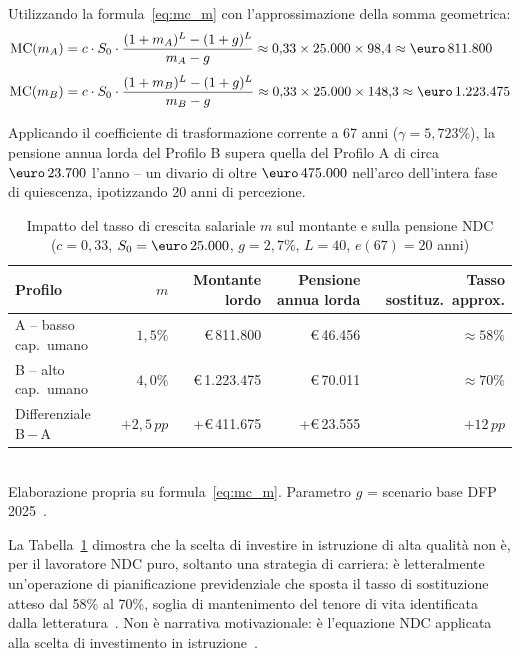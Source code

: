 Utilizzando la formula~\eqref{eq:mc_m} con l'approssimazione della
somma geometrica:
%
\begin{align}
  \mathrm{MC}(m_A) &= c \cdot S_0 \cdot
    \frac{(1+m_A)^L - (1+g)^L}{m_A - g}
    \approx 0{,}33 \times 25.000 \times 98{,}4
    \approx \text{\euro}\,811.800
    \label{eq:mc_A}\\[4pt]
  \mathrm{MC}(m_B) &= c \cdot S_0 \cdot
    \frac{(1+m_B)^L - (1+g)^L}{m_B - g}
    \approx 0{,}33 \times 25.000 \times 148{,}3
    \approx \text{\euro}\,1.223.475
    \label{eq:mc_B}
\end{align}

Applicando il coefficiente di trasformazione corrente a 67 anni
(\(\gamma = 5{,}723\%\)), la pensione annua lorda del Profilo B supera quella
del Profilo A di circa \(\text{\euro}\,23.700\) l'anno --
un divario di oltre \(\text{\euro}\,475.000\) nell'arco dell'intera fase di
quiescenza, ipotizzando 20 anni di percezione.

\begin{table}[htbp]
\centering
\caption{Impatto del tasso di crescita salariale \(m\) sul montante
         e sulla pensione NDC\\
         (\(c=0{,}33\), \(S_0=\text{\euro}\,25.000\), \(g=2{,}7\%\),
          \(L=40\), \(e(67)=20\) anni)}
\label{tab:montante_m}
\begin{tabular}{lrrrr}
\toprule
Profilo & \(m\) & Montante lordo &
  Pensione annua lorda & Tasso sostituz.\ approx.\\
\midrule
A -- basso cap.\ umano & \(1{,}5\%\) &
  \euro\,811.800 & \euro\,46.456 & $\approx 58\%$ \\
B -- alto cap.\ umano  & \(4{,}0\%\) &
  \euro\,1.223.475 & \euro\,70.011 & $\approx 70\%$ \\
\midrule
Differenziale B\,$-$\,A & $+2{,}5\,pp$ &
  +\euro\,411.675 & +\euro\,23.555 & $+12\,pp$ \\
\bottomrule
\end{tabular}
\smallskip\\
\footnotesize Elaborazione propria su formula~\eqref{eq:mc_m}.
Parametro \(g\) = scenario base DFP 2025~\cite{MEFRGS2025}.
\end{table}

La Tabella~\ref{tab:montante_m} dimostra che la scelta di investire in
istruzione di alta qualità non è, per il lavoratore NDC puro, soltanto una
strategia di carriera: è letteralmente un'operazione di pianificazione
previdenziale che sposta il tasso di sostituzione atteso dal 58\% al 70\%,
soglia di mantenimento del tenore di vita identificata dalla letteratura~\cite{Bosi2018}.
Non è narrativa motivazionale: è l'equazione NDC applicata alla scelta di
investimento in istruzione~\cite{Becker1964, Mincer1974}.

